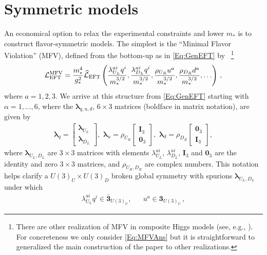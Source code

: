 \documentclass[aps,prl,twocolumn,showpacs,10pt,preprintnumbers,nofootinbib]{revtex4-2}
\newcommand{\mst}{m_*}
\begin{document}
\section{Symmetric models}\label{Sec:Symm}
 An economical option to relax the experimental constraints and lower $\mst$ is to construct flavor-symmetric models. The simplest is the        ``Minimal Flavor Violation'' (MFV),  defined from the bottom-up as in \eqref{Eq:GenEFT} by \cite{Redi:2011zi, Barbieri:2012tu}~\footnote{There are other realization of MFV in composite Higgs models (see, e.g., \cite{Glioti:2024hye}). For concreteness we only consider \eqref{Eq:MFVAns} but it is straightforward to generalized the main construction of the paper to other realizations.} 
\begin{align}\label{Eq:MFVAns}
    {\cal L}^{\text{MFV}}_{\rm EFT}=\frac{m_*^4}{g_*^2}\widehat{\cal L}_{\rm EFT}\left(\frac{\lambda^{ai}_{U_L} q^i}{m_*^{3/2}},\frac{\lambda^{ai}_{D_L} q^i}{m_*^{3/2}},\frac{\rho_{U_R} u^a}{m_*^{3/2}},\frac{\rho_{D_R} d^a}{m_*^{3/2}},\ldots \right)\,,
\end{align}
where $a=1,2,3$. We arrive at this structure from \eqref{Eq:GenEFT} starting with $\alpha=1,\ldots,6$, where the $\boldsymbol{\lambda}_{q,u,d}$, $6\times3$ matrices (boldface in matrix notation), are given by
\begin{align}\label{Eq:MFVAnsStruct}
\boldsymbol{\lambda}_{q} = \begin{bmatrix}
    \boldsymbol\lambda_{U_L}\\
    \boldsymbol\lambda_{D_L}
\end{bmatrix} ,\,\, \boldsymbol\lambda_{u} = \rho_{U_R}\begin{bmatrix}
     \mathbf{I}_3\\
    \mathbf{0}_3
\end{bmatrix},\,\, \boldsymbol\lambda_{d} = \rho_{D_R}\begin{bmatrix}
    \mathbf{0}_3 \\ \mathbf{I}_3
\end{bmatrix},
\end{align}
where $\boldsymbol{\lambda}_{U_L,D_L}$ are $3 \times 3$ matrices with elements $\lambda_{U_L}^{ai},\, \lambda_{D_L}^{ai}$, $\mathbf{I}_3$ and $\mathbf{0}_3$ are the identity and zero $3 \times 3$ matrices, and $\rho_{U_R,D_R}$ are complex numbers. This notation helps clarify a $U(3)_U\times U(3)_D$  broken global symmetry with spurions $\boldsymbol{\lambda}_{U_L,D_L}$ under which
\begin{align}\label{Eq:MFVGroup}
\lambda_{U_L}^{ai}q^i\in \bar{\mathbf{3}}_{U(3)_U},&& u^a\in \mathbf{3}_{U(3)_U}\,,
\end{align}
\end{document}
